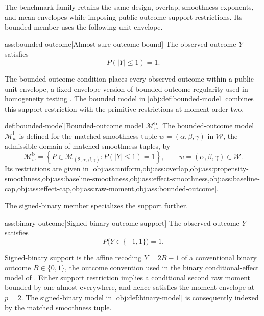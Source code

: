 The benchmark family retains the same design, overlap, smoothness exponents, and mean envelopes while imposing public outcome support restrictions. Its bounded member uses the following unit envelope.

\begin{assumptionv}{ass:bounded-outcome}[Almost sure outcome bound]
The observed outcome \(Y\) satisfies
\[
P(|Y|\le 1)=1.
\]
\end{assumptionv}

The bounded-outcome condition places every observed outcome within a public unit envelope, a fixed-envelope version of bounded-outcome regularity used in homogeneity testing \citep{LapentaStrittmatterVergara2026Omnibus}. The bounded model  in \cref{obj:def:bounded-model} combines this support restriction with the primitive restrictions at moment order two.

\begin{definitionv}{def:bounded-model}[Bounded-outcome model $\mathcal M^{\mathrm b}_w$]
The bounded-outcome model \(\mathcal M^{\mathrm b}_w\) is defined for the matched smoothness tuple \(w=(\alpha,\beta,\gamma)\) in \(\mathcal W\), the admissible domain of matched smoothness tuples, by
\[
\mathcal M^{\mathrm b}_w
=
\left\{
P\in\mathcal M_{(2,\alpha,\beta,\gamma)}:
P(|Y|\le 1)=1
\right\},
\qquad
w=(\alpha,\beta,\gamma)\in\mathcal W.
\]
Its restrictions are given in \cref{obj:ass:uniform,obj:ass:overlap,obj:ass:propensity-smoothness,obj:ass:baseline-smoothness,obj:ass:effect-smoothness,obj:ass:baseline-cap,obj:ass:effect-cap,obj:ass:raw-moment,obj:ass:bounded-outcome}.
\end{definitionv}

The signed-binary member specializes the support further.

\begin{assumptionv}{ass:binary-outcome}[Signed binary outcome support]
The observed outcome \(Y\) satisfies
\[
P\bigl(Y\in\{-1,1\}\bigr)=1.
\]
\end{assumptionv}

Signed-binary support is the affine recoding \(Y=2B-1\) of a conventional binary outcome \(B\in\{0,1\}\), the outcome convention used in the binary conditional-effect model of \citet[Section 2]{KennedyBalakrishnanRobinsWasserman2024MinimaxCATE}. Either support restriction implies a conditional second raw moment bounded by one almost everywhere, and hence satisfies the moment envelope at \(p=2\). The signed-binary model  in \cref{obj:def:binary-model} is consequently indexed by the matched smoothness tuple.

